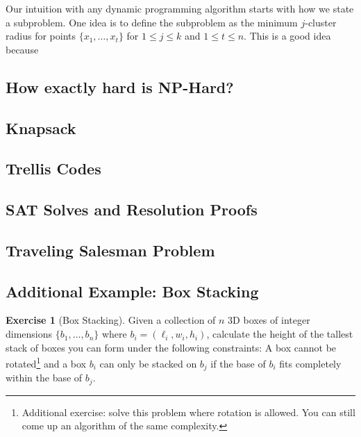 \documentclass[10pt]{article}
\theoremstyle{plain}
\theoremstyle{definition}
\newtheorem{exer}[thm]{Exercise}
\numberwithin{equation}{section}
\numberwithin{figure}{section}
\begin{document}
\noindent Our intuition with any dynamic programming algorithm starts with how we state a subproblem. One idea is to define the subproblem as the minimum $j$-cluster radius for points $\{x_1, \ldots, x_t\}$ for $1 \leq j \leq k$ and $1 \leq t \leq n$. This is a good idea because


\subsection{How exactly hard is NP-Hard?}

\subsection{Knapsack}

\subsection{Trellis Codes}

\subsection{SAT Solves and Resolution Proofs}

\subsection{Traveling Salesman Problem}

\subsection{Additional Example: Box Stacking}

\begin{exer}[Box Stacking] Given a collection of $n$ 3D boxes of integer dimensions $\{b_1, \ldots, b_n\}$ where $b_i = (\ell_i, w_i, h_i)$, calculate the height of the tallest stack of boxes you can form under the following constraints: A box cannot be rotated\footnote{Additional exercise: solve this problem where rotation is allowed. You can still come up an algorithm of the same complexity.} and a box $b_i$ can only be stacked on $b_j$ if the base of $b_i$ fits completely within the base of $b_j$.
\end{exer}
\end{document}
